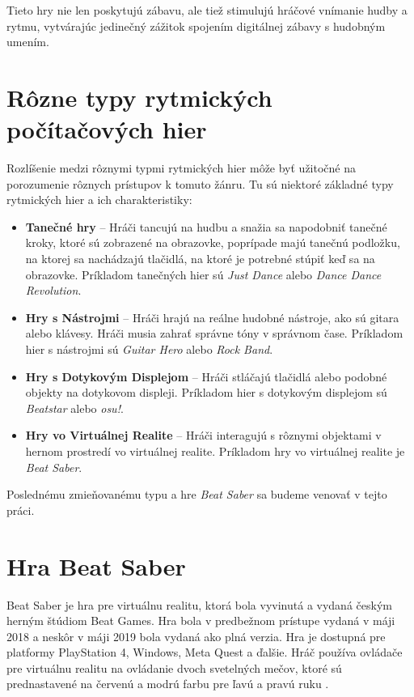 Tieto hry nie len poskytujú zábavu, ale tiež stimulujú hráčové vnímanie hudby a rytmu, vytvárajúc jedinečný zážitok spojením digitálnej zábavy s hudobným umením.

\section{Rôzne typy rytmických počítačových hier}\label{sec:typy}


Rozlíšenie medzi rôznymi typmi rytmických hier môže byť užitočné na porozumenie rôznych prístupov k tomuto žánru. Tu sú niektoré základné typy rytmických hier a ich charakteristiky:

\begin{itemize}

\item \textbf{Tanečné hry} – Hráči tancujú na hudbu a snažia sa napodobniť tanečné kroky, ktoré sú zobrazené na obrazovke, poprípade majú tanečnú podložku, na ktorej sa nachádzajú tlačidlá, na ktoré je potrebné stúpiť keď sa na obrazovke. Príkladom tanečných hier sú \textit{Just Dance} alebo \textit{Dance Dance Revolution}.
\item \textbf{Hry s Nástrojmi} – Hráči hrajú na reálne hudobné nástroje, ako sú gitara alebo klávesy. Hráči musia zahrať správne tóny v správnom čase. Príkladom hier s nástrojmi sú \textit{Guitar Hero} alebo \textit{Rock Band}.
\item \textbf{Hry s Dotykovým Displejom} – Hráči stláčajú tlačidlá alebo podobné objekty na dotykovom displeji. Príkladom hier s dotykovým displejom sú \textit{Beatstar} alebo \textit{osu!}.
\item \textbf{Hry vo Virtuálnej Realite} – Hráči interagujú s rôznymi objektami v hernom prostredí vo virtuálnej realite. Príkladom hry vo virtuálnej realite je \textit{Beat Saber}.
\end{itemize}

Poslednému zmieňovanému typu a hre \textit{Beat Saber} sa budeme venovať v tejto práci. 

\section{Hra Beat Saber}\label{sec:beat_saber}

Beat Saber je hra pre virtuálnu realitu, ktorá bola vyvinutá a vydaná českým herným štúdiom Beat Games. Hra bola v predbežnom prístupe vydaná v máji 2018 a neskôr v máji 2019 bola vydaná ako plná verzia. Hra je dostupná pre platformy PlayStation 4, Windows, Meta Quest a ďalšie. Hráč používa ovládače pre virtuálnu realitu na ovládanie dvoch svetelných mečov, ktoré sú prednastavené na červenú a modrú farbu pre ľavú a pravú ruku \cite{sutrich2020beatsaber}.

